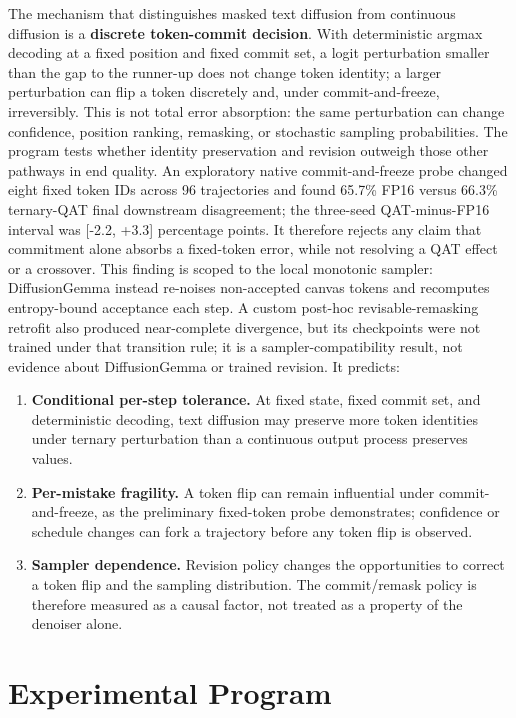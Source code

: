 \documentclass[11pt]{article}
\begin{document}
The mechanism that distinguishes masked text diffusion from continuous diffusion is a \textbf{discrete token-commit decision}. With deterministic argmax decoding at a fixed position and fixed commit set, a logit perturbation smaller than the gap to the runner-up does not change token identity; a larger perturbation can flip a token discretely and, under commit-and-freeze, irreversibly. This is not total error absorption: the same perturbation can change confidence, position ranking, remasking, or stochastic sampling probabilities. The program tests whether identity preservation and revision outweigh those other pathways in end quality. An exploratory native commit-and-freeze probe changed eight fixed token IDs across 96 trajectories and found 65.7\% FP16 versus 66.3\% ternary-QAT final downstream disagreement; the three-seed QAT-minus-FP16 interval was [-2.2, +3.3] percentage points. It therefore rejects any claim that commitment alone absorbs a fixed-token error, while not resolving a QAT effect or a crossover. This finding is scoped to the local monotonic sampler: DiffusionGemma instead re-noises non-accepted canvas tokens and recomputes entropy-bound acceptance each step. A custom post-hoc revisable-remasking retrofit also produced near-complete divergence, but its checkpoints were not trained under that transition rule; it is a sampler-compatibility result, not evidence about DiffusionGemma or trained revision. It predicts:

\begin{enumerate}
\item \textbf{Conditional per-step tolerance.} At fixed state, fixed commit set, and deterministic decoding, text diffusion may preserve more token identities under ternary perturbation than a continuous output process preserves values.
\item \textbf{Per-mistake fragility.} A token flip can remain influential under commit-and-freeze, as the preliminary fixed-token probe demonstrates; confidence or schedule changes can fork a trajectory before any token flip is observed.
\item \textbf{Sampler dependence.} Revision policy changes the opportunities to correct a token flip and the sampling distribution. The commit/remask policy is therefore measured as a causal factor, not treated as a property of the denoiser alone.
\end{enumerate}

\section{Experimental Program}
\end{document}

